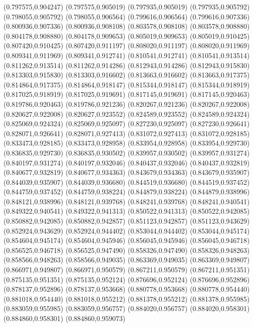 (0.797575,0.904247)
(0.797575,0.905019)
(0.797935,0.905019)
(0.797935,0.905792)
(0.798055,0.905792)
(0.798055,0.906564)
(0.799616,0.906564)
(0.799616,0.907336)
(0.800936,0.907336)
(0.800936,0.908108)
(0.803578,0.908108)
(0.803578,0.908880)
(0.804178,0.908880)
(0.804178,0.909653)
(0.805019,0.909653)
(0.805019,0.910425)
(0.807420,0.910425)
(0.807420,0.911197)
(0.808020,0.911197)
(0.808020,0.911969)
(0.809341,0.911969)
(0.809341,0.912741)
(0.810541,0.912741)
(0.810541,0.913514)
(0.811262,0.913514)
(0.811262,0.914286)
(0.812943,0.914286)
(0.812943,0.915830)
(0.813303,0.915830)
(0.813303,0.916602)
(0.813663,0.916602)
(0.813663,0.917375)
(0.814864,0.917375)
(0.814864,0.918147)
(0.815344,0.918147)
(0.815344,0.918919)
(0.817025,0.918919)
(0.817025,0.919691)
(0.817145,0.919691)
(0.817145,0.920463)
(0.819786,0.920463)
(0.819786,0.921236)
(0.820267,0.921236)
(0.820267,0.922008)
(0.820627,0.922008)
(0.820627,0.923552)
(0.824589,0.923552)
(0.824589,0.924324)
(0.825069,0.924324)
(0.825069,0.925097)
(0.827230,0.925097)
(0.827230,0.926641)
(0.828071,0.926641)
(0.828071,0.927413)
(0.831072,0.927413)
(0.831072,0.928185)
(0.833473,0.928185)
(0.833473,0.928958)
(0.833954,0.928958)
(0.833954,0.929730)
(0.836835,0.929730)
(0.836835,0.930502)
(0.839957,0.930502)
(0.839957,0.931274)
(0.840197,0.931274)
(0.840197,0.932046)
(0.840437,0.932046)
(0.840437,0.932819)
(0.840677,0.932819)
(0.840677,0.934363)
(0.843679,0.934363)
(0.843679,0.935907)
(0.844039,0.935907)
(0.844039,0.936680)
(0.844519,0.936680)
(0.844519,0.937452)
(0.844759,0.937452)
(0.844759,0.938224)
(0.844879,0.938224)
(0.844879,0.938996)
(0.848121,0.938996)
(0.848121,0.939768)
(0.848241,0.939768)
(0.848241,0.940541)
(0.849322,0.940541)
(0.849322,0.941313)
(0.850522,0.941313)
(0.850522,0.942085)
(0.850882,0.942085)
(0.850882,0.942857)
(0.851123,0.942857)
(0.851123,0.943629)
(0.852924,0.943629)
(0.852924,0.944402)
(0.853044,0.944402)
(0.853044,0.945174)
(0.854604,0.945174)
(0.854604,0.945946)
(0.856045,0.945946)
(0.856045,0.946718)
(0.856525,0.946718)
(0.856525,0.947490)
(0.858326,0.947490)
(0.858326,0.948263)
(0.858566,0.948263)
(0.858566,0.949035)
(0.863369,0.949035)
(0.863369,0.949807)
(0.866971,0.949807)
(0.866971,0.950579)
(0.867211,0.950579)
(0.867211,0.951351)
(0.875135,0.951351)
(0.875135,0.952124)
(0.876696,0.952124)
(0.876696,0.952896)
(0.878137,0.952896)
(0.878137,0.953668)
(0.880778,0.953668)
(0.880778,0.954440)
(0.881018,0.954440)
(0.881018,0.955212)
(0.881378,0.955212)
(0.881378,0.955985)
(0.883059,0.955985)
(0.883059,0.956757)
(0.884020,0.956757)
(0.884020,0.958301)
(0.884860,0.958301)
(0.884860,0.959073)

